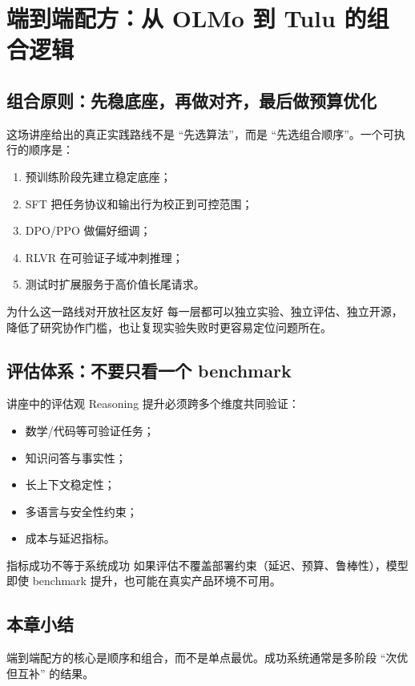 \section{端到端配方：从 OLMo 到 Tulu 的组合逻辑}

\subsection{组合原则：先稳底座，再做对齐，最后做预算优化}
这场讲座给出的真正实践路线不是 ``先选算法''，而是 ``先选组合顺序''。一个可执行的顺序是：
\begin{enumerate}
    \item 预训练阶段先建立稳定底座；
    \item SFT 把任务协议和输出行为校正到可控范围；
    \item DPO/PPO 做偏好细调；
    \item RLVR 在可验证子域冲刺推理；
    \item 测试时扩展服务于高价值长尾请求。
\end{enumerate}

\begin{knowledgebox}{为什么这一路线对开放社区友好}
每一层都可以独立实验、独立评估、独立开源，降低了研究协作门槛，也让复现实验失败时更容易定位问题所在。
\end{knowledgebox}

\subsection{评估体系：不要只看一个 benchmark}
\begin{importantbox}{讲座中的评估观}
Reasoning 提升必须跨多个维度共同验证：
\begin{itemize}
    \item 数学/代码等可验证任务；
    \item 知识问答与事实性；
    \item 长上下文稳定性；
    \item 多语言与安全性约束；
    \item 成本与延迟指标。
\end{itemize}
\end{importantbox}

\begin{warningbox}{指标成功不等于系统成功}
如果评估不覆盖部署约束（延迟、预算、鲁棒性），模型即使 benchmark 提升，也可能在真实产品环境不可用。
\end{warningbox}

\subsection{本章小结}
端到端配方的核心是顺序和组合，而不是单点最优。成功系统通常是多阶段 ``次优但互补'' 的结果。


